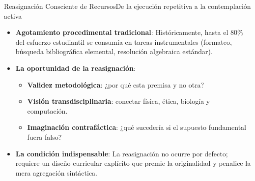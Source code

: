 \documentclass[aspectratio=169,11pt]{beamer}
\begin{document}
\begin{frame}{Reasignación Consciente de Recursos}{De la ejecución
  repetitiva a la contemplación activa}
\begin{itemize}\setlength{\itemsep}{0.6em}
    \item \textbf{Agotamiento procedimental tradicional}:
      Históricamente, hasta el $80\%$ del esfuerzo estudiantil se
      consumía en tareas instrumentales (formateo, búsqueda
      bibliográfica elemental, resolución algebraica estándar).
    \item \textbf{La oportunidad de la reasignación}:
    \begin{itemize}\setlength{\itemsep}{0.3em}
        \item \textbf{Validez metodológica}: ¿por qué esta premisa y no otra?
        \item \textbf{Visión transdisciplinaria}: conectar física, ética,
          biología y computación.
        \item \textbf{Imaginación contrafáctica}: ¿qué sucedería si el
          supuesto fundamental fuera falso?
      \end{itemize}
    \item \textbf{La condición indispensable}: La reasignación no
      ocurre por defecto; requiere un diseño curricular explícito
      que premie la originalidad y penalice la mera agregación sintáctica.
  \end{itemize}
\end{frame}
\end{document}
